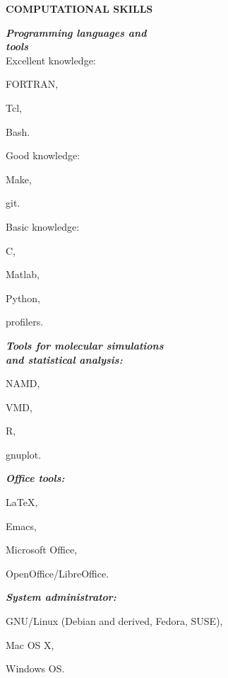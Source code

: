 \documentclass[a4paper,11pt,final]{memoir}
\newcommand{\Sep}{\vspace{1.em}}
\newcommand{\SmallSep}{\vspace{0.2em}}
\newcommand{\CVSection}[1]
	{\Large\textbf{#1}\par
	\SmallSep\normalsize\normalfont}
\newcommand{\CVItem}[2]
	{\textit{\textbf{\color{RoyalBlue} #1}} #2}
\begin{document}
\Sep
\CVSection{COMPUTATIONAL SKILLS}
\begin{multicols}{3}
\CVItem{
Programming languages and \\
tools\hfill
} \\
Excellent knowledge:
\begin{compactitem}[\color{RoyalBlue}$\circ$]
\item FORTRAN,
\item Tcl,
\item Bash.
\end{compactitem}
Good knowledge:
\begin{compactitem}[\color{RoyalBlue}$\circ$]
\item Make,
\item git.
\end{compactitem}
Basic knowledge:
\begin{compactitem}[\color{RoyalBlue}$\circ$]
\item C,
\item Matlab,
\item Python,
\item profilers.
\end{compactitem}
\SmallSep
 
\CVItem{Tools for molecular simulations\\ and statistical analysis:\hfill}
\begin{compactitem}[\color{RoyalBlue}$\circ$]
\item NAMD,
\item VMD,
\item R,
\item gnuplot.
\end{compactitem}
\SmallSep

\CVItem{Office tools:\hfill}
\begin{compactitem}[\color{RoyalBlue}$\circ$]
\item LaTeX,
\item Emacs,
\item Microsoft Office,
\item OpenOffice/LibreOffice. 
\end{compactitem}
\SmallSep

\CVItem{System administrator:\hfill}
\begin{compactitem}[\color{RoyalBlue}$\circ$]
\item GNU/Linux (Debian and derived, Fedora, SUSE),
\item Mac OS X,
\item Windows OS.
\end{compactitem}
\SmallSep


\end{multicols}
\end{document}
